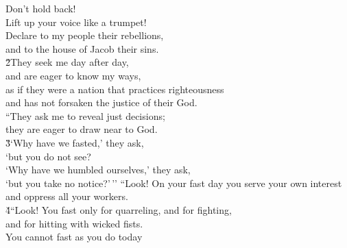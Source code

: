 \begin{poetry}
\poemll    Don't hold back! \\
\poemlll       Lift up your voice like a trumpet! \\
\poeml Declare to my people their rebellions, \\
\poemll    and to the house of Jacob their sins. \\
\poeml \v{2}They seek me day after day, \\
\poemll    and are eager to know my ways, \\
\poeml as if they were a nation that practices righteousness \\
\poemll    and has not forsaken the justice of their God. \\
\poeml ``They ask me to reveal just decisions; \\
\poemll    they are eager to draw near to God. \\
\poeml \v{3}`Why have we fasted,' they ask, \\
\poemll    `but you do not see? \\
\poeml `Why have we humbled ourselves,' they ask, \\
\poemll    `but you take no notice?'\,''
\poeml ``Look! On your fast day you serve your own interest \\
\poemll    and oppress all your workers. \\
\poeml \v{4}``Look! You fast only for quarreling, and for fighting, \\
\poemll    and for hitting with wicked fists. \\
\poeml You cannot fast as you do today \\

\end{poetry}

